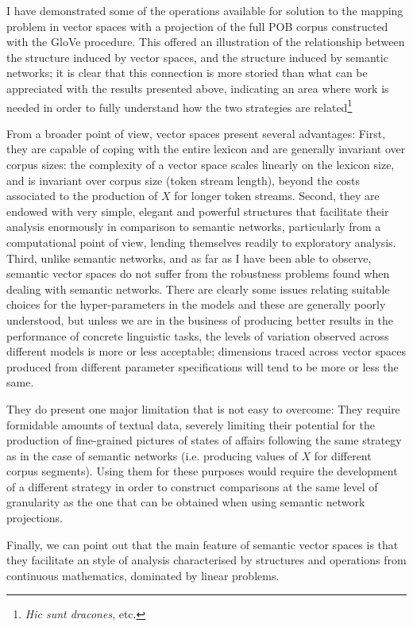 I have demonstrated some of the operations available for solution to the mapping problem in vector spaces with a projection of the full POB corpus constructed with the GloVe procedure.
This offered an illustration of the relationship between the structure induced by vector spaces, and the structure induced by semantic networks; it is clear that this connection is more storied than what can be appreciated with the results presented above, indicating an area where work is needed in order to fully understand how the two strategies are related\footnote{
    \emph{Hic sunt dracones}, etc.
}

From a broader point of view, vector spaces present several advantages:
First, they are capable of coping with the entire lexicon and are generally invariant over corpus sizes: the complexity of a vector space scales linearly on the lexicon size, and is invariant over corpus size (token stream length), beyond the costs associated to the production of $X$ for longer token streams.
Second, they are endowed with very simple, elegant and powerful structures that facilitate their analysis enormously in comparison to semantic networks, particularly from a computational point of view, lending themselves readily to exploratory analysis.
Third, unlike semantic networks, and as far as I have been able to observe, semantic vector spaces do not suffer from the robustness problems found when dealing with semantic networks.
There are clearly some issues relating suitable choices for the hyper-parameters in the models and these are generally poorly understood, but unless we are in the business of producing better results in the performance of concrete linguistic tasks, the levels of variation observed across different models is more or less acceptable; dimensions traced across vector spaces produced from different parameter specifications will tend to be more or less the same.

They do present one major limitation that is not easy to overcome:
They require formidable amounts of textual data, severely limiting their potential for the production of fine-grained pictures of states of affairs following the same strategy as in the case of semantic networks (i.e. producing values of $X$ for different corpus segments).
Using them for these purposes would require the development of a different strategy in order to construct comparisons at the same level of granularity as the one that can be obtained when using semantic network projections.

Finally, we can point out that the main feature of semantic vector spaces is that they facilitate an style of analysis characterised by structures and operations from continuous mathematics, dominated by linear problems.
